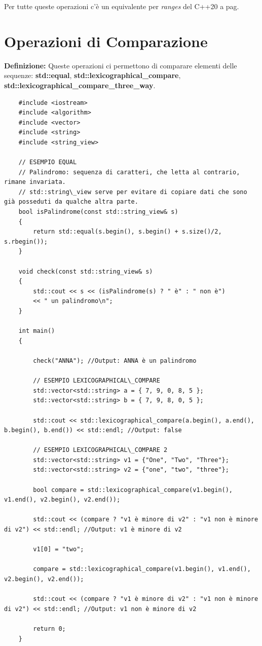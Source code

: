 \fleuron

\textsf{\small Per tutte queste operazioni c'è un equivalente per \emph{ranges} del C++20 a pag. \pageref{ranges}} \\


\newpage

\section{Operazioni di Comparazione}

\textsf{\small \textbf{Definizione: } Queste operazioni ci permettono di comparare elementi delle sequenze: \textbf{std::equal}, \textbf{std::lexicographical\_compare}, \textbf{std::lexicographical\_compare\_three\_way}.} \\

\begin{lstlisting}
	#include <iostream>
	#include <algorithm>
	#include <vector>
	#include <string>
	#include <string_view>
	
	// ESEMPIO EQUAL
	// Palindromo: sequenza di caratteri, che letta al contrario, rimane invariata.
	// std::string\_view serve per evitare di copiare dati che sono già posseduti da qualche altra parte.
	bool isPalindrome(const std::string_view& s)
	{
		return std::equal(s.begin(), s.begin() + s.size()/2, s.rbegin());
	}
	
	void check(const std::string_view& s)
	{
		std::cout << s << (isPalindrome(s) ? " è" : " non è")
		<< " un palindromo\n";
	}
	
	int main()
	{
	
		check("ANNA"); //Output: ANNA è un palindromo
		
		// ESEMPIO LEXICOGRAPHICAL\_COMPARE
		std::vector<std::string> a = { 7, 9, 0, 8, 5 };
		std::vector<std::string> b = { 7, 9, 8, 0, 5 };
		
		std::cout << std::lexicographical_compare(a.begin(), a.end(), b.begin(), b.end()) << std::endl; //Output: false
		
		// ESEMPIO LEXICOGRAPHICAL\_COMPARE 2
		std::vector<std::string> v1 = {"One", "Two", "Three"};
		std::vector<std::string> v2 = {"one", "two", "three"};
		
		bool compare = std::lexicographical_compare(v1.begin(), v1.end(), v2.begin(), v2.end());
		
		std::cout << (compare ? "v1 è minore di v2" : "v1 non è minore di v2") << std::endl; //Output: v1 è minore di v2
		
		v1[0] = "two";
		
		compare = std::lexicographical_compare(v1.begin(), v1.end(), v2.begin(), v2.end());
		
		std::cout << (compare ? "v1 è minore di v2" : "v1 non è minore di v2") << std::endl; //Output: v1 non è minore di v2
		
		return 0;
	}
\end{lstlisting}

